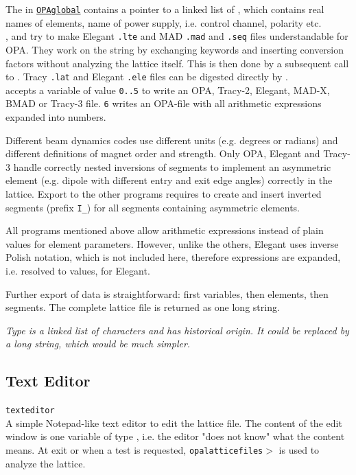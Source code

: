 \documentclass[12pt]{article}
\newcommand\code[1]{{\tt #1}}
\newcommand{\unico}[1]{{\color{burntorange}\code{#1}}}
\newcommand{\prcod}[2]{\opauni{#1}$>$\unico{#2}}
\newcommand{\opagui}[1]{\colorbox{blue!20}{\code{#1}}}
\newcommand{\oguih}[2]{\subsection{\label{#2}#1}{\Huge\opagui{#2}}\\}
\newcommand{\opauni}[1]{\colorbox{orange!30}{\code{#1}}}
\newcommand{\ouni}[1]{\hyperref[#1]{\opauni{#1}}}
\newcommand{\desc}[1]{#1}
\newcommand{\todo}[1]{{\color{red}\em #1}}
\begin{document}
{The \unico{ElementType} in \ouni{OPAglobal} contains a pointer to a linked list of \unico{NameListType},  which contains real names of elements, name of power supply, i.e. control channel, polarity etc. \\


\unico{lteconvert}, \unico{madconvert} and \unico{madseqconvert} try to make Elegant \code{*.lte} and MAD \code{*.mad} and \code{*.seq} files understandable for OPA. They work on the \unico{TextBuffer} string by exchanging keywords and inserting conversion factors without analyzing the lattice itself. This is then done by a subsequent call to \unico{LatRead}. Tracy \code{*.lat} and Elegant \code{*.ele} files can be digested directly by \unico{LatRead}.\\

\unico{WriteLattice} accepts a variable \unico{mode} of value \code{0..5} to write an OPA, Tracy-2, Elegant, MAD-X, BMAD or Tracy-3 file. \unico{mode} \code{6} writes an OPA-file with all arithmetic expressions expanded into numbers.

Different beam dynamics codes use different units (e.g. degrees or radians) and different definitions of magnet order and strength. Only OPA, Elegant and Tracy-3 handle correctly nested inversions of segments to implement an asymmetric element (e.g. dipole with different entry and exit edge angles) correctly in the lattice. Export to the other programs requires to create and insert inverted segments (prefix \code{I\_}) for all segments containing asymmetric elements.

All  programs mentioned above allow arithmetic expressions instead of plain values for element parameters. However, unlike the others, Elegant uses inverse Polish notation, which is not included here, therefore expressions are expanded, i.e. resolved to values, for Elegant.

Further export of data is straightforward: first variables, then elements, then segments. The complete lattice file is returned as one long string.
}

\todo{Type \unico{TextBuffer} is a linked list of characters and has historical origin. It could be replaced by a long string, which would be much simpler.}

\oguih{Text Editor}{texteditor} 
\desc{A simple Notepad-like text editor to edit the lattice file. The content of the edit window is one variable of type \unico{textbuffer}, i.e. the editor "does not know" what the content means. At exit or when a test is requested, \prcod{opalatticefiles}{LatRead} is used to analyze the lattice.}
\end{document}

